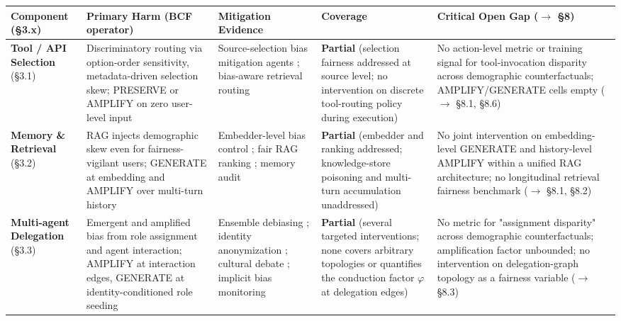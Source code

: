 \documentclass[10pt]{article}
\begin{document}
\begin{center}\footnotesize
\begin{longtable}{|p{}|p{}|p{}|p{}|p{}|}
\hline \textbf{Component (\S{}3.x)} & \textbf{Primary Harm (BCF operator)} & \textbf{Mitigation Evidence} & \textbf{Coverage} & \textbf{Critical Open Gap ($\rightarrow$ \S{}8)} \\ \hline\endhead
\textbf{Tool / API Selection} (\S{}3.1) & Discriminatory routing via option-order sensitivity, metadata-driven selection skew; PRESERVE or AMPLIFY on zero user-level input \cite{blankenstein2025biasbusters,sneh2025tooltweak} & Source-selection bias mitigation agents \cite{singh2025bias,singh2025biasb}; bias-aware retrieval routing & \textbf{Partial} (selection fairness addressed at source level; no intervention on discrete tool-routing policy during execution) & No action-level metric or training signal for tool-invocation disparity across demographic counterfactuals; AMPLIFY/GENERATE cells empty ($\rightarrow$ \S{}8.1, \S{}8.6) \\ \hline
\textbf{Memory \& Retrieval} (\S{}3.2) & RAG injects demographic skew even for fairness-vigilant users; GENERATE at embedding and AMPLIFY over multi-turn history \cite{hu2024free,fan2024fairmt,wang2025bias} & Embedder-level bias control \cite{kim2025mitigating}; fair RAG ranking \cite{kim2024fair}; memory audit \cite{ma2026implicit} & \textbf{Partial} (embedder and ranking addressed; knowledge-store poisoning and multi-turn accumulation unaddressed) & No joint intervention on embedding-level GENERATE and history-level AMPLIFY within a unified RAG architecture; no longitudinal retrieval fairness benchmark ($\rightarrow$ \S{}8.1, \S{}8.2) \\ \hline
\textbf{Multi-agent Delegation} (\S{}3.3) & Emergent and amplified bias from role assignment and agent interaction; AMPLIFY at interaction edges, GENERATE at identity-conditioned role seeding \cite{nguyen2025social,madigan2025emergent} & Ensemble debiasing \cite{owens2024multi,xu2024mitigating}; identity anonymization \cite{choi2025identity}; cultural debate \cite{ki2025multiple}; implicit bias monitoring \cite{borah2024implicit} & \textbf{Partial} (several targeted interventions; none covers arbitrary topologies or quantifies the conduction factor $\varphi$ at delegation edges) & No metric for "assignment disparity" across demographic counterfactuals; amplification factor unbounded; no intervention on delegation-graph topology as a fairness variable ($\rightarrow$ \S{}8.3) \\ \hline

\end{longtable}
\end{center}
\end{document}
